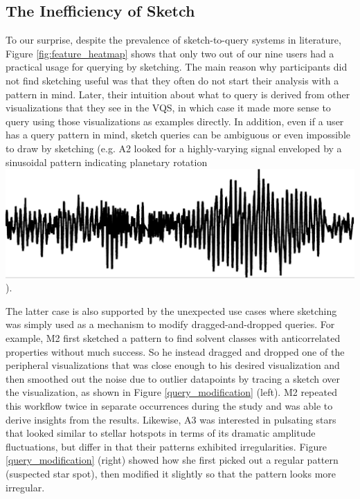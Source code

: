 \subsection{The Inefficiency of Sketch}
\par To our surprise, despite the prevalence of sketch-to-query systems in literature, Figure \ref{fig:feature_heatmap} shows that only two out of our nine users had a practical usage for querying by sketching. %
The main reason why participants did not find sketching useful was that they often do not start their analysis with a pattern in mind. Later, their intuition about what to query is derived from other visualizations that they see in the VQS, in which case it made more sense to query using those visualizations as examples directly. In addition, even if a user has a query pattern in mind, sketch queries can be ambiguous or even impossible to draw by sketching (e.g. A2 looked for a highly-varying signal enveloped by a sinusoidal pattern indicating planetary rotation \includegraphics[width=2\baselineskip,keepaspectratio]{figures/impossible_sketch.png}).
\par The latter case is also supported by the unexpected use cases where sketching was simply used as a mechanism to modify dragged-and-dropped queries. For example, M2 first sketched a pattern to find solvent classes with anticorrelated properties without much success.
So he instead dragged and dropped one of the peripheral visualizations that was close enough to his desired visualization and then smoothed out the noise due to outlier datapoints by tracing a sketch over the visualization, as shown in Figure \ref{query_modification} (left). M2 repeated this workflow twice in separate occurrences during the study and was able to derive insights from the results. Likewise, A3 was interested in pulsating stars that looked similar to stellar hotspots in terms of its dramatic amplitude fluctuations, but differ in that their patterns exhibited irregularities. Figure \ref{query_modification} (right) showed how she first picked out a regular pattern (suspected star spot), then modified it slightly so that the pattern looks more irregular.
